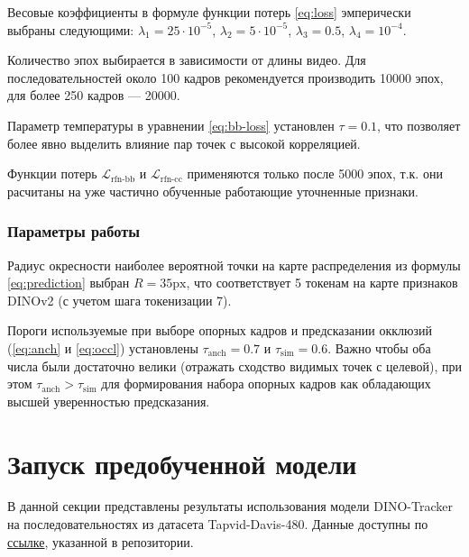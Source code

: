\documentclass[a4paper, 14pt]{extarticle}
\theoremstyle{definition}
\theoremstyle{plain}
\theoremstyle{remark}
\begin{document}
Весовые коэффициенты в формуле функции потерь \ref{eq:loss} эмперически выбраны следующими: $\lambda_1=25\cdot 10^{-5}$, $\lambda_2=5\cdot 10^{-5}$, $\lambda_3=0.5$, $\lambda_4= 10^{-4}$.

Количество эпох выбирается в зависимости от длины видео. Для последовательностей около 100 кадров рекомендуется производить 10000 эпох, для более 250 кадров --- 20000.

Параметр температуры в уравнении \ref{eq:bb-loss} установлен $\tau=0.1$, что позволяет более явно выделить влияние пар точек с высокой корреляцией.

Функции потерь $\mathcal{L}_{\text{rfn-bb}}$ и $\mathcal{L}_{\text{rfn-cc}}$ применяются только после 5000 эпох, т.к. они расчитаны на уже частично обученные работающие уточненные признаки.

\subsubsection{Параметры работы}
Радиус окресности наиболее вероятной точки на карте распределения из формулы \ref{eq:prediction} выбран $R=35\text{px}$, что соответствует 5 токенам на карте признаков DINOv2 (с учетом шага токенизации 7).

Пороги используемые при выборе опорных кадров и предсказании окклюзий (\ref{eq:anch} и \ref{eq:occl}) установлены $\tau_{\text{anch}}=0.7$ и $\tau_{\text{sim}}=0.6$. Важно чтобы оба числа были достаточно велики (отражать сходство видимых точек с целевой), при этом $\tau_{\text{anch}} > \tau_{\text{sim}}$ для формирования набора опорных кадров как обладающих высшей уверенностью предсказания.

\newpage

\section{Запуск предобученной модели}
В данной секции представлены результаты использования модели DINO-Tracker на последовательностях из датасета 
Tapvid-Davis-480. Данные доступны по \href{https://www.dropbox.com/scl/fo/7s2rgsm92qbzzh2xnx51d/AIvXxRaJPL2RQm43Zi_taJU?e=1&preview=davis_480.zip&rlkey=6cs0bm2u0on1u7z0jyxlq8avq&st=7s75r77a&dl=0}{ссылке}, указанной в репозитории.
\end{document}
